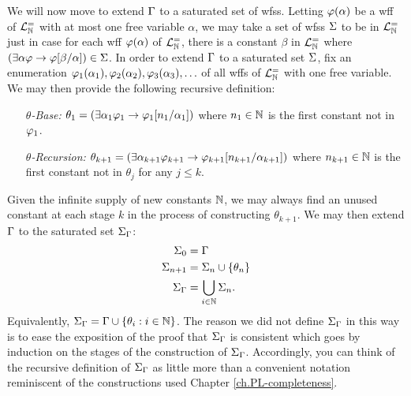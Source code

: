 We will now move to extend $\Gamma$ to a saturated set of wfss.
Letting $\varphi(\alpha)$ be a wff of $\mathcal{L}^{=}_{\mathbb{N}}$ with at most one free variable $\alpha$, we may take a set of wfss $\Sigma$ to be  in $\mathcal{L}^{=}_{\mathbb{N}}$ just in case for each wff $\varphi(\alpha)$ of $\mathcal{L}^{=}_{\mathbb{N}}$, there is a constant $\beta$ in $\mathcal{L}^{=}_{\mathbb{N}}$ where $(\exists \alpha\varphi \rightarrow \varphi[\beta/\alpha])\in\Sigma$.
In order to extend $\Gamma$ to a saturated set $\Sigma$, fix an enumeration $\varphi_1(\alpha_1),\varphi_2(\alpha_2),\varphi_3(\alpha_3),\ldots$ of all wffs of $\mathcal{L}^{=}_{\mathbb{N}}$ with one free variable. %
We may then provide the following recursive definition:
\begin{enumerate}[leftmargin=1in]
  \item[\it $\theta$-Base:] $\theta_1=(\exists \alpha_1\varphi_1\rightarrow \varphi_1[n_1/\alpha_1])$ where $n_1\in\mathbb{N}$ is the first constant not in $\varphi_1$.
  \item[\it $\theta$-Recursion:] $\theta_{k+1}=(\exists \alpha_{k+1}\varphi_{k+1}\rightarrow \varphi_{k+1}[n_{k+1}/\alpha_{k+1}])$  where $n_{k+1}\in\mathbb{N}$ is the first constant not in $\theta_j$ for any $j\leq k$.
\end{enumerate}
Given the infinite supply of new constants $\mathbb{N}$, we may always find an unused constant at each stage $k$ in the process of constructing $\theta_{k+1}$.
We may then extend $\Gamma$ to the saturated set $\Sigma_{\Gamma}$:
\begin{align*}
  \label{name}
  \Sigma_0     &= \Gamma\\
  \Sigma_{n+1} &= \Sigma_n\cup\lbrace\theta_n\rbrace\\
  \Sigma_{\Gamma} &= \bigcup_{i\in\mathbb{N}}\Sigma_n.
\end{align*}
Equivalently, $\Sigma_{\Gamma}=\Gamma\cup\lbrace\theta_i:i\in\mathbb{N}\rbrace$.
The reason we did not define $\Sigma_{\Gamma}$ in this way is to ease the exposition of the proof that $\Sigma_{\Gamma}$ is consistent which goes by induction on the stages of the construction of $\Sigma_{\Gamma}$. 
Accordingly, you can think of the recursive definition of $\Sigma_{\Gamma}$ as little more than a convenient notation reminiscent of the constructions used Chapter \ref{ch.PL-completeness}.

